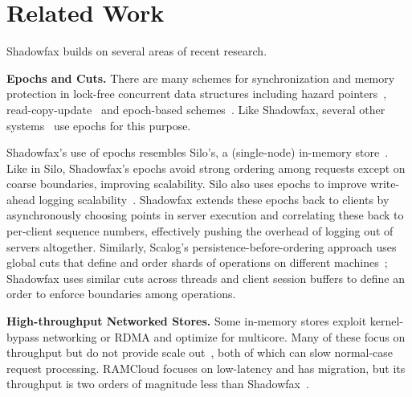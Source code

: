 \section{Related Work}
\label{sec:related}

Shadowfax builds on several areas of recent
research.

\noindent
{\bf Epochs and Cuts.}
There are many schemes for synchronization and memory protection in lock-free
concurrent data structures including hazard pointers~\cite{hazard},
read-copy-update~\cite{rcu} and epoch-based schemes~\cite{epochs,epochs-phd}.
Like Shadowfax, several other
systems~\cite{bwtree,deuteronomy,deuteronomy-ranges,hekaton-indexing} use epochs for this purpose.


Shadowfax's use of epochs resembles Silo's, a (single-node)
in-memory store~\cite{silo}. Like in Silo, Shadowfax's epochs avoid strong
ordering among requests except on coarse boundaries, improving scalability.
Silo also uses epochs to improve write-ahead logging
scalability~\cite{silor}.  Shadowfax extends these epochs back to clients by
asynchronously choosing points in server execution and correlating these back
to per-client sequence numbers, effectively pushing the overhead of logging out
of servers altogether. Similarly, Scalog's persistence-before-ordering approach uses
global cuts that define and order shards of operations on different
machines~\cite{scalog}; Shadowfax uses similar cuts across threads and client
session buffers to define an order to enforce boundaries among operations.

\noindent
{\bf High-throughput Networked Stores.}
Some in-memory stores exploit kernel-bypass networking or RDMA and optimize
for multicore. Many of these focus on throughput but do not provide
scale out~\cite{pilaf,mica,herd}, both of which
can slow normal-case request processing. RAMCloud focuses on low-latency
and has migration, but its throughput is two
orders of magnitude less than Shadowfax~\cite{ramcloud,ramcloud-recovery}.


